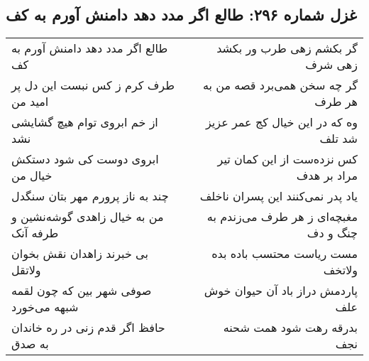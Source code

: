 \begin{center}
\section*{غزل شماره ۲۹۶: طالع اگر مدد دهد دامنش آورم به کف}
\label{sec:sh296}
\begin{longtable}{l p{0.5cm} r}
طالع اگر مدد دهد دامنش آورم به کف
&&
گر بکشم زهی طرب ور بکشد زهی شرف
\\
طرف کرم ز کس نبست این دل پر امید من
&&
گر چه سخن همی‌برد قصه من به هر طرف
\\
از خم ابروی توام هیچ گشایشی نشد
&&
وه که در این خیال کج عمر عزیز شد تلف
\\
ابروی دوست کی شود دستکش خیال من
&&
کس نزده‌ست از این کمان تیر مراد بر هدف
\\
چند به ناز پرورم مهر بتان سنگدل
&&
یاد پدر نمی‌کنند این پسران ناخلف
\\
من به خیال زاهدی گوشه‌نشین و طرفه آنک
&&
مغبچه‌ای ز هر طرف می‌زندم به چنگ و دف
\\
بی خبرند زاهدان نقش بخوان ولاتقل
&&
مست ریاست محتسب باده بده ولاتخف
\\
صوفی شهر بین که چون لقمه شبهه می‌خورد
&&
پاردمش دراز باد آن حیوان خوش علف
\\
حافظ اگر قدم زنی در ره خاندان به صدق
&&
بدرقه رهت شود همت شحنه نجف
\\
\end{longtable}
\end{center}
